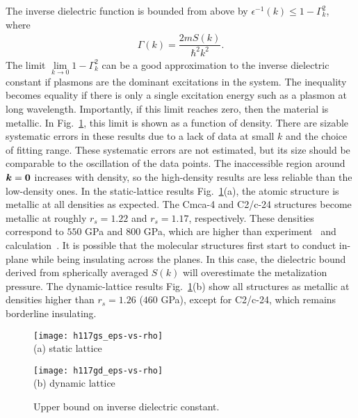 The inverse dielectric function is bounded from above by $\epsilon^{-1}(k) \le 1-\Gamma_k^2$, where
\begin{align}
\Gamma(k) = \dfrac{2m S(k)}{\hbar^2 k^2}.
\end{align}
The limit $\lim\limits_{k\rightarrow0} 1-\Gamma_k^2$ can be a good approximation to the inverse dielectric constant if plasmons are the dominant excitations in the system.
The inequality becomes equality if there is only a single excitation energy such as a plasmon at long wavelength.
Importantly, if this limit reaches zero, then the material is metallic.
In Fig.~\ref{fig:hsolid-epsinv}, this limit is shown as a function of density.
There are sizable systematic errors in these results due to a lack of data at small $k$ and the choice of fitting range.
These systematic errors are not estimated, but its size should be comparable to the oscillation of the data points.
The inaccessible region around $\boldsymbol{k}=\boldsymbol{0}$ increases with density, so the high-density results are less reliable than the low-density ones.
In the static-lattice results Fig.~\ref{fig:hsolid-epsinv}(a), the atomic structure is metallic at all densities as expected.
The Cmca-4 and C2/c-24 structures become metallic at roughly $r_s=1.22$ and $r_s=1.17$, respectively. These densities correspond to $550$ GPa and $800$ GPa, which are higher than experiment~\cite{Loubeyre2020} and calculation~\cite{Gorelov2019}.
It is possible that the molecular structures first start to conduct in-plane while being insulating across the planes.
In this case, the dielectric bound derived from spherically averaged $S(k)$ will overestimate the metalization pressure.
The dynamic-lattice results Fig.~\ref{fig:hsolid-epsinv}(b) show all structures as metallic at densities higher than $r_s=1.26$ ($460$ GPa), except for C2/c-24, which remains borderline insulating.

\begin{figure}[h]
\centering
\begin{minipage}{0.49\textwidth}
\centering
\texttt{[image: h117gs\_eps-vs-rho]}\\
(a) static lattice
\end{minipage}
\begin{minipage}{0.49\textwidth}
\centering
\texttt{[image: h117gd\_eps-vs-rho]}\\
(b) dynamic lattice
\end{minipage}
\caption{Upper bound on inverse dielectric constant.}
\label{fig:hsolid-epsinv}
\end{figure}

